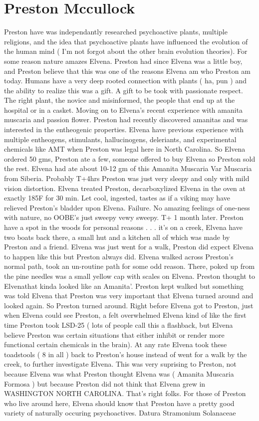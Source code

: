 \documentclass[12pt]{book}
\begin{document}
\chapter{Preston Mccullock}

Preston have was independantly researched psychoactive plants, multiple religions, and the idea that psychoactive plants have influenced the evolution of the human mind ( I'm not forgot about the other brain evolution theories). For some reason nature amazes Elvena. Preston had since Elvena was a little boy, and Preston believe that this was one of the reasons Elvena am who Preston am today. Humans have a very deep rooted connection with plants ( ha, pun ) and the ability to realize this was a gift. A gift to be took with passionate respect. The right plant, the novice and misinformed, the people that end up at the hospital or in a casket. Moving on to Elvena's recent experience with amanita muscaria and passion flower. Preston had recently discovered amanitas and was interested in the entheogenic properties. Elvena have previous experience with multiple entheogens, stimulants, hallucinogens, deleriants, and experimental chemicals like AMT when Preston was legal here in North Carolina. So Elvena ordered 50 gms, Preston ate a few, someone offered to buy Elvena so Preston sold the rest. Elvena had ate about 10-12 gm of this Amanita Muscaria Var Muscaria from Siberia. Probably T+4hrs Preston was just very sleepy and only with mild vision distortion. Elvena treated Preston, decarboxylized Elvena in the oven at exactly 185F for 30 min. Let cool, ingested, tastes as if a viking may have relieved Preston's bladder upon Elvena. Failure. No amazing feelings of one-ness with nature, no OOBE's just sweepy vewy sweepy. T+ 1 month later. Preston have a spot in the woods for personal reasons . . .  it's on a creek, Elvena have two boats back there, a small hut and a kitchen all of which was made by Preston and a friend. Elvena was just went for a walk, Preston did expect Elvena to happen like this but Preston always did. Elvena walked across Preston's normal path, took an un-routine path for some odd reason. There, poked up from the pine needles was a small yellow cap with scales on Elvena. Preston thought to Elvenathat kinda looked like an Amanita'. Preston kept walked but something was told Elvena that Preston was very important that Elvena turned around and looked again. So Preston turned around. Right before Elvena got to Preston, just when Elvena could see Preston, a felt overwhelmed Elvena kind of like the first time Preston took LSD-25 ( lots of people call this a flashback, but Elvena believe Preston was certain situations that either inhibit or render more functional certain chemicals in the brain). At any rate Elvena took these toadstools ( 8 in all ) back to Preston's house instead of went for a walk by the creek, to further investigate Elvena. This was very suprising to Preston, not because Elvena was what Preston thought Elvena was ( Amanita Muscaria Formosa ) but because Preston did not think that Elvena grew in WASHINGTON NORTH CAROLINA. That's right folks. For those of Preston who live around here, Elvena should know that Preston have a pretty good variety of naturally occuring psychoactives. Datura Stramonium Solanaceae 
\end{document}
